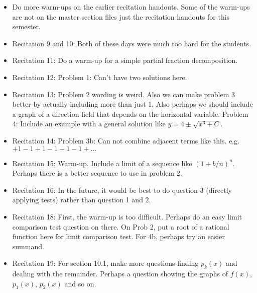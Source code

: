 \documentclass{article}
\begin{document}
\large

\begin{itemize}
\item Do more warm-ups on the earlier recitation handouts. Some of the warm-ups are not on the master section files just the recitation handouts for this semester. 
\item Recitation 9 and 10: Both of these days were much too hard for the students. 
\item Recitation 11: Do a warm-up for a simple partial fraction decomposition.
\item Recitation 12: Problem 1: Can't have two solutions here.
\item Recitation 13: Problem 2 wording is weird. Also we can make problem 3 better by actually including more than just 1. Also perhaps we should include a graph of a direction field that depends on the horizontal variable. Problem 4: Include an example with a general solution like $y=4\pm \sqrt{x^3+C}$. 
\item Recitation 14: Problem 3b: Can not combine adjacent terms like this. e.g. $+1-1+1-1+1-1+\ldots$
\item Recitation 15: Warm-up. Include a limit of a sequence like $(1+b/n)^n$. Perhaps there is a better sequence to use in problem 2.
\item Recitation 16: In the future, it would be best to do question 3 (directly applying tests) rather than question 1 and 2.
\item Recitation 18: First, the warm-up is too difficult. Perhaps do an easy limit comparison test question on there. On Prob 2, put a root of a rational function here for limit comparison test. For 4b, perhaps try an easier summand. 
\item Recitation 19: For section 10.1, make more questions finding $p_k(x)$ and dealing with the remainder. Perhaps a question showing the graphs of $f(x)$, $p_1(x)$, $p_2(x)$ and so on.  
\end{itemize}
\end{document}
